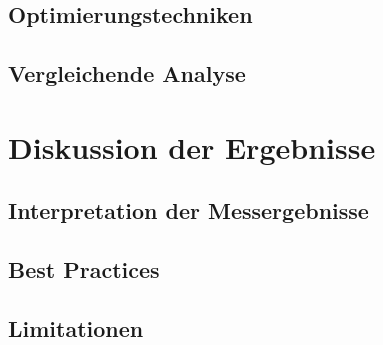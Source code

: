 \subsection{Optimierungstechniken}

\subsection{Vergleichende Analyse}

\section{Diskussion der Ergebnisse}

\subsection{Interpretation der Messergebnisse}

\subsection{Best Practices}

\subsection{Limitationen}
